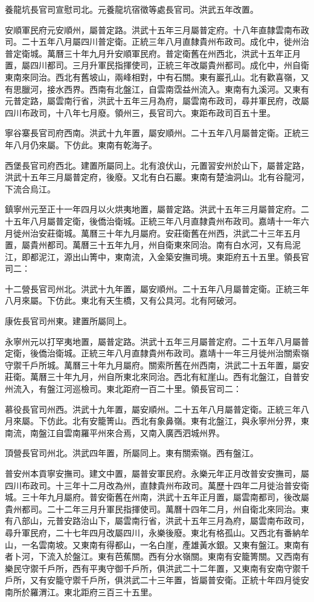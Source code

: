 養龍坑長官司宣慰司北。元養龍坑宿徵等處長官司。洪武五年改置。

安順軍民府元安順州，屬普定路。洪武十五年三月屬普定府。十八年直隸雲南布政司。二十五年八月屬四川普定衛。正統三年八月直隸貴州布政司。成化中，徙州治普定衛城。萬曆三十年九月升安順軍民府。普定衛舊在州西北，洪武十五年正月置，屬四川都司。三月升軍民指揮使司，正統三年改屬貴州都司。成化中，州自衛東南來同治。西北有舊坡山，兩峰相對，中有石關。東有巖孔山。北有歡喜嶺，又有思臘河，接水西界。西南有北盤江，自雲南霑益州流入。東南有九溪河。又東有元普定路，屬雲南行省，洪武十五年三月為府，屬雲南布政司，尋并軍民府，改屬四川布政司，十八年七月廢。領州三，長官司六。東距布政司百五十里。

寧谷寨長官司府西南。洪武十九年置，屬安順州。二十五年八月屬普定衛。正統三年八月仍來屬。下仿此。東南有乾海子。

西堡長官司府西北。建置所屬同上。北有浪伏山，元置習安州於山下，屬普定路，洪武十五年三月屬普定府，後廢。又北有白石巖。東南有楚油洞山。北有谷龍河，下流合烏江。

鎮寧州元至正十一年四月以火烘夷地置，屬普定路。洪武十五年三月屬普定府。二十五年八月屬普定衛，後僑治衛城。正統三年八月直隸貴州布政司。嘉靖十一年六月徙州治安莊衛城。萬曆三十年九月屬府。安莊衛舊在州西，洪武二十三年五月置，屬貴州都司。萬曆三十五年九月，州自衛東來同治。南有白水河，又有烏泥江，即都泥江，源出山箐中，東南流，入金築安撫司境。東距府五十五里。領長官司二：

十二營長官司州北。洪武十九年置，屬安順州。二十五年八月屬普定衛。正統三年八月來屬。下仿此。東北有天生橋，又有公具河。北有阿破河。

康佐長官司州東。建置所屬同上。

永寧州元以打罕夷地置，屬普定路。洪武十五年三月屬普定府。二十五年八月屬普定衛，後僑治衛城。正統三年八月直隸貴州布政司。嘉靖十一年三月徙州治關索嶺守禦千戶所城。萬曆三十年九月屬府。關索所舊在州西南，洪武二十五年置，屬安莊衛。萬曆三十年九月，州自所東北來同治。西北有紅崖山。西有北盤江，自普安州流入，有盤江河巡檢司。東北距府一百二十里。領長官司二：

慕役長官司州西。洪武十九年置，屬安順州。二十五年八月屬普定衛。正統三年八月來屬。下仿此。北有安籠箐山。西北有象鼻嶺。東有北盤江，與永寧州分界，東南流，南盤江自雲南羅平州來合焉，又南入廣西泗城州界。

頂營長官司州北。洪武四年置，所屬同上。東有關索嶺。西有盤江。

普安州本貢寧安撫司。建文中置，屬普安軍民府。永樂元年正月改普安安撫司，屬四川布政司。十三年十二月改為州，直隸貴州布政司。萬歷十四年二月徙治普安衛城。三十年九月屬府。普安衛舊在州南，洪武十五年正月置，屬雲南都司，後改屬貴州都司。二十二年三月升軍民指揮使司。萬曆十四年二月，州自衛北來同治。東有八部山，元普安路治山下，屬雲南行省，洪武十五年三月為府，屬雲南布政司，尋升軍民府，二十七年四月改屬四川，永樂後廢。東北有格孤山。又西北有番納牟山，一名雲南坡。又東南有得都山，一名白崖，產雄黃水銀。又東有盤江。東南有者卜河，下流入於盤江。東有芭蕉關。西有分水嶺關。東南有安籠箐關。又西南有樂民守禦千戶所，西有平夷守御千戶所，俱洪武二十二年置，又東南有安南守禦千戶所，又有安籠守禦千戶所，俱洪武二十三年置，皆屬普安衛。正統十年四月徙安南所於羅渭江。東北距府三百三十五里。

